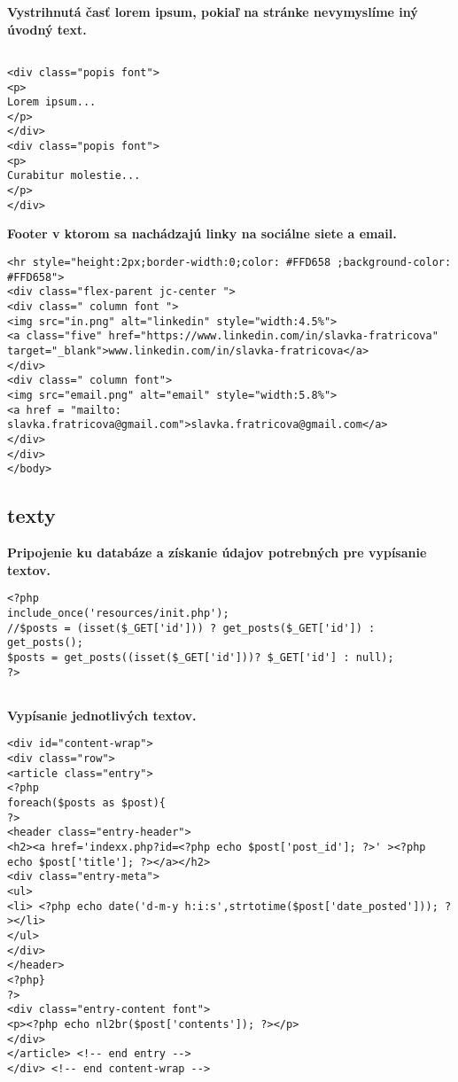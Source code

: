 \vspace{0.5cm}
\textbf{Vystrihnutá časť lorem ipsum, pokiaľ na stránke nevymyslíme iný úvodný text.}
\vspace{0.5cm}
\begin{lstlisting}

<div class="popis font">
<p>
Lorem ipsum...
</p>
</div>
<div class="popis font">
<p>
Curabitur molestie...
</p>
</div>

\end{lstlisting}
\vspace{0.5cm}
\textbf{Footer v ktorom sa nachádzajú linky na sociálne siete a email. }
\vspace{0.5cm}
\begin{lstlisting}
<hr style="height:2px;border-width:0;color: #FFD658 ;background-color: #FFD658">
<div class="flex-parent jc-center ">
<div class=" column font ">
<img src="in.png" alt="linkedin" style="width:4.5%">
<a class="five" href="https://www.linkedin.com/in/slavka-fratricova" target="_blank">www.linkedin.com/in/slavka-fratricova</a>
</div>
<div class=" column font">
<img src="email.png" alt="email" style="width:5.8%">
<a href = "mailto: slavka.fratricova@gmail.com">slavka.fratricova@gmail.com</a>
</div>
</div>
</body>
\end{lstlisting}

\subsection{texty}
\vspace{0.5cm}
\textbf{Pripojenie ku databáze a získanie údajov potrebných pre vypísanie textov.}
\vspace{0.5cm}
\begin{lstlisting}
<?php
include_once('resources/init.php');
//$posts = (isset($_GET['id'])) ? get_posts($_GET['id']) : get_posts();
$posts = get_posts((isset($_GET['id']))? $_GET['id'] : null);
?>


\end{lstlisting}
\vspace{0.5cm}
\textbf{Vypísanie jednotlivých textov.}
\vspace{0.5cm}
\begin{lstlisting}
<div id="content-wrap">
<div class="row">
<article class="entry">
<?php
foreach($posts as $post){
?>
<header class="entry-header">
<h2><a href='indexx.php?id=<?php echo $post['post_id']; ?>' ><?php echo $post['title']; ?></a></h2>						
<div class="entry-meta">
<ul>
<li> <?php echo date('d-m-y h:i:s',strtotime($post['date_posted'])); ?></li>
</ul>
</div>
</header>
<?php}
?>
<div class="entry-content font">
<p><?php echo nl2br($post['contents']); ?></p>
</div>	
</article> <!-- end entry -->
</div> <!-- end content-wrap -->
\end{lstlisting}


